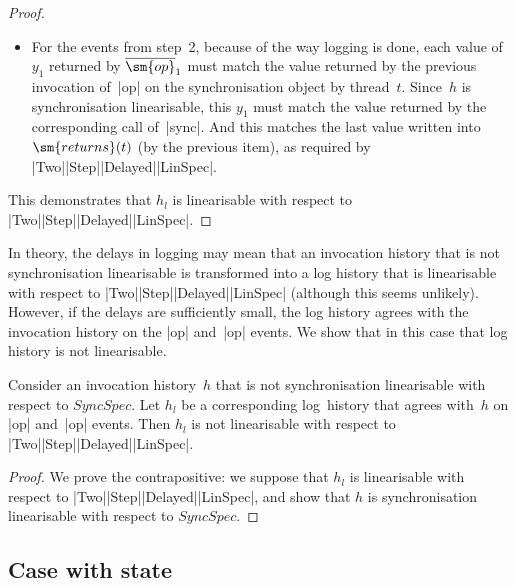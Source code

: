 \begin{proof}
\begin{itemize}
\item For the events from step~2, because of the way logging is done, each
  value of~$y_1$ returned by $\overline{\sm{op}}_1$ must match the value
  returned by the previous invocation of~|op| on the synchronisation object
  by thread~$t$.  Since~$h$ is synchronisation linearisable, this $y_1$ must
  match the value returned by the corresponding call of~|sync|.  And this
  matches the last value written into $\sm{returns}(t)$ (by the previous
  item), as required by |Two|\-|Step|\-|Delayed|\-|LinSpec|.
\end{itemize}

%
This demonstrates that
$h_l$ is linearisable with respect to |Two|\-|Step|\-|Delayed|\-|LinSpec|.
\end{proof}


In theory, the delays in logging may mean that an invocation history that is not
synchronisation linearisable is transformed into a log history that is
linearisable with respect to |Two|\-|Step|\-|Delayed|\-|LinSpec| (although
this seems unlikely).  However, if the delays are sufficiently small, the
log history agrees with the invocation history on the |op| and~|op|
events.  We show that in this case that log history is not linearisable.
%
\begin{lemma}
Consider an invocation history~$h$ that is not synchronisation linearisable
with respect to $SyncSpec$.  Let $h_l$ be a corresponding log~history that
agrees with~$h$ on |op| and~|op| events.  Then $h_l$ is not linearisable
with respect to |Two|\-|Step|\-|Delayed|\-|LinSpec|.
\end{lemma}


\begin{proof}
We prove the contrapositive: we suppose that $h_l$ is linearisable with
respect to |Two|\-|Step|\-|Delayed|\-|LinSpec|, and show that $h$ is
synchronisation linearisable with respect to $SyncSpec$.  

\end{proof}



\subsection{Case with state}

